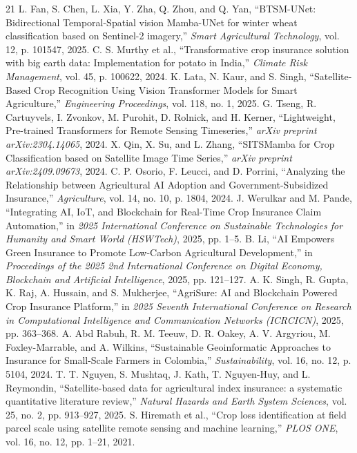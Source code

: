 \documentclass[conference]{IEEEtran}
\begin{document}
\begin{thebibliography}{21}
 L. Fan, S. Chen, L. Xia, Y. Zha, Q. Zhou, and Q. Yan, ``BTSM-UNet: Bidirectional Temporal-Spatial vision Mamba-UNet for winter wheat classification based on Sentinel-2 imagery,'' \emph{Smart Agricultural Technology}, vol. 12, p. 101547, 2025.
 C. S. Murthy et al., ``Transformative crop insurance solution with big earth data: Implementation for potato in India,'' \emph{Climate Risk Management}, vol. 45, p. 100622, 2024.
 K. Lata, N. Kaur, and S. Singh, ``Satellite-Based Crop Recognition Using Vision Transformer Models for Smart Agriculture,'' \emph{Engineering Proceedings}, vol. 118, no. 1, 2025.
 G. Tseng, R. Cartuyvels, I. Zvonkov, M. Purohit, D. Rolnick, and H. Kerner, ``Lightweight, Pre-trained Transformers for Remote Sensing Timeseries,'' \emph{arXiv preprint arXiv:2304.14065}, 2024.
 X. Qin, X. Su, and L. Zhang, ``SITSMamba for Crop Classification based on Satellite Image Time Series,'' \emph{arXiv preprint arXiv:2409.09673}, 2024.
 C. P. Osorio, F. Leucci, and D. Porrini, ``Analyzing the Relationship between Agricultural AI Adoption and Government-Subsidized Insurance,'' \emph{Agriculture}, vol. 14, no. 10, p. 1804, 2024.
 J. Werulkar and M. Pande, ``Integrating AI, IoT, and Blockchain for Real-Time Crop Insurance Claim Automation,'' in \emph{2025 International Conference on Sustainable Technologies for Humanity and Smart World (HSWTech)}, 2025, pp. 1–5.
 B. Li, ``AI Empowers Green Insurance to Promote Low-Carbon Agricultural Development,'' in \emph{Proceedings of the 2025 2nd International Conference on Digital Economy, Blockchain and Artificial Intelligence}, 2025, pp. 121–127.
 A. K. Singh, R. Gupta, K. Raj, A. Hussain, and S. Mukherjee, ``AgriSure: AI and Blockchain Powered Crop Insurance Platform,'' in \emph{2025 Seventh International Conference on Research in Computational Intelligence and Communication Networks (ICRCICN)}, 2025, pp. 363–368.
 A. Abd Rabuh, R. M. Teeuw, D. R. Oakey, A. V. Argyriou, M. Foxley-Marrable, and A. Wilkins, ``Sustainable Geoinformatic Approaches to Insurance for Small-Scale Farmers in Colombia,'' \emph{Sustainability}, vol. 16, no. 12, p. 5104, 2024.
 T. T. Nguyen, S. Mushtaq, J. Kath, T. Nguyen-Huy, and L. Reymondin, ``Satellite-based data for agricultural index insurance: a systematic quantitative literature review,'' \emph{Natural Hazards and Earth System Sciences}, vol. 25, no. 2, pp. 913–927, 2025.
 S. Hiremath et al., ``Crop loss identification at field parcel scale using satellite remote sensing and machine learning,'' \emph{PLOS ONE}, vol. 16, no. 12, pp. 1–21, 2021.

\end{thebibliography}
\end{document}

